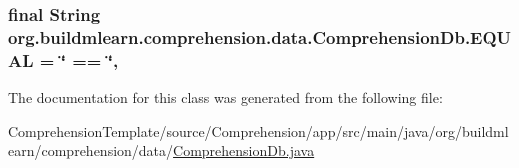 \subsubsection[{\texorpdfstring{E\+Q\+U\+AL}{EQUAL}}]{\setlength{\rightskip}{0pt plus 5cm}final String org.\+buildmlearn.\+comprehension.\+data.\+Comprehension\+Db.\+E\+Q\+U\+AL = \char`\"{} == \char`\"{}\hspace{0.3cm}{\ttfamily [static]}, {\ttfamily [private]}}\hypertarget{classorg_1_1buildmlearn_1_1comprehension_1_1data_1_1ComprehensionDb_a2507c01acdda71b0cbde4c68ee03cadf}{}\label{classorg_1_1buildmlearn_1_1comprehension_1_1data_1_1ComprehensionDb_a2507c01acdda71b0cbde4c68ee03cadf}


The documentation for this class was generated from the following file\+:\begin{DoxyCompactItemize}
\item 
Comprehension\+Template/source/\+Comprehension/app/src/main/java/org/buildmlearn/comprehension/data/\hyperlink{ComprehensionDb_8java}{Comprehension\+Db.\+java}\end{DoxyCompactItemize}
